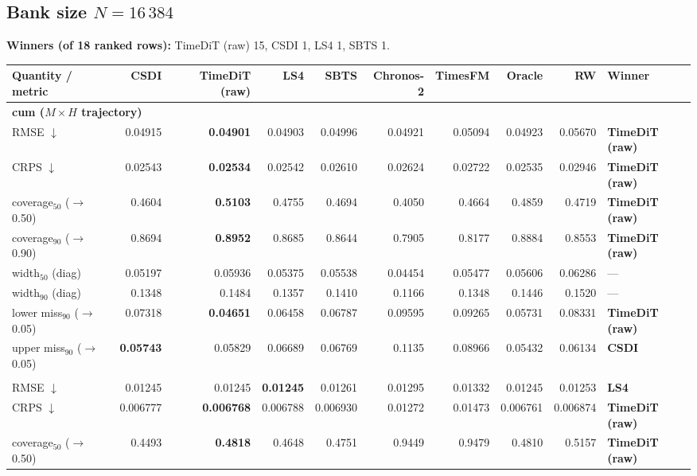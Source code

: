 \documentclass[11pt,a4paper]{article}
\begin{document}
\begin{landscape}
\section*{Bank size $N = 16\,384$}
\noindent\textbf{Winners (of 18 ranked rows):} TimeDiT (raw) 15, CSDI 1, LS4 1, SBTS 1.
\begin{center}\small
\begin{tabular}{lrrrrrrrrl}
\toprule
Quantity / metric & CSDI & TimeDiT (raw) & LS4 & SBTS & Chronos-2 & TimesFM & Oracle & RW & Winner \\
\midrule
\multicolumn{10}{l}{\textbf{cum ($M\times H$ trajectory)}} \\
RMSE $\downarrow$ & 0.04915 & \textbf{0.04901} & 0.04903 & 0.04996 & 0.04921 & 0.05094 & 0.04923 & 0.05670 & \textbf{TimeDiT (raw)} \\
CRPS $\downarrow$ & 0.02543 & \textbf{0.02534} & 0.02542 & 0.02610 & 0.02624 & 0.02722 & 0.02535 & 0.02946 & \textbf{TimeDiT (raw)} \\
coverage$_{50}$ ($\to$0.50) & 0.4604 & \textbf{0.5103} & 0.4755 & 0.4694 & 0.4050 & 0.4664 & 0.4859 & 0.4719 & \textbf{TimeDiT (raw)} \\
coverage$_{90}$ ($\to$0.90) & 0.8694 & \textbf{0.8952} & 0.8685 & 0.8644 & 0.7905 & 0.8177 & 0.8884 & 0.8553 & \textbf{TimeDiT (raw)} \\
width$_{50}$ (diag) & 0.05197 & 0.05936 & 0.05375 & 0.05538 & 0.04454 & 0.05477 & 0.05606 & 0.06286 & --- \\
width$_{90}$ (diag) & 0.1348 & 0.1484 & 0.1357 & 0.1410 & 0.1166 & 0.1348 & 0.1446 & 0.1520 & --- \\
lower miss$_{90}$ ($\to$0.05) & 0.07318 & \textbf{0.04651} & 0.06458 & 0.06787 & 0.09595 & 0.09265 & 0.05731 & 0.08331 & \textbf{TimeDiT (raw)} \\
upper miss$_{90}$ ($\to$0.05) & \textbf{0.05743} & 0.05829 & 0.06689 & 0.06769 & 0.1135 & 0.08966 & 0.05432 & 0.06134 & \textbf{CSDI} \\
\addlinespace
\multicolumn{10}{l}{\textbf{step ($M\times H$)}} \\
RMSE $\downarrow$ & 0.01245 & 0.01245 & \textbf{0.01245} & 0.01261 & 0.01295 & 0.01332 & 0.01245 & 0.01253 & \textbf{LS4} \\
CRPS $\downarrow$ & 0.006777 & \textbf{0.006768} & 0.006788 & 0.006930 & 0.01272 & 0.01473 & 0.006761 & 0.006874 & \textbf{TimeDiT (raw)} \\
coverage$_{50}$ ($\to$0.50) & 0.4493 & \textbf{0.4818} & 0.4648 & 0.4751 & 0.9449 & 0.9479 & 0.4810 & 0.5157 & \textbf{TimeDiT (raw)} \\

\end{tabular}
\end{center}
\end{landscape}
\end{document}
